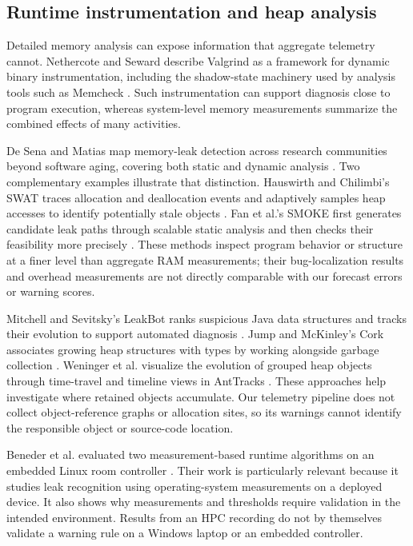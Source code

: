 \documentclass[10pt,a4paper,twocolumn]{article}
\begin{document}
\subsection{Runtime instrumentation and heap analysis}

Detailed memory analysis can expose information that aggregate telemetry cannot. Nethercote and Seward describe Valgrind as a framework for dynamic binary instrumentation, including the shadow-state machinery used by analysis tools such as Memcheck \cite{ref12}. Such instrumentation can support diagnosis close to program execution, whereas system-level memory measurements summarize the combined effects of many activities.

De Sena and Matias map memory-leak detection across research communities beyond software aging, covering both static and dynamic analysis \cite{ref13}. Two complementary examples illustrate that distinction. Hauswirth and Chilimbi's SWAT traces allocation and deallocation events and adaptively samples heap accesses to identify potentially stale objects \cite{ref14}. Fan et al.'s SMOKE first generates candidate leak paths through scalable static analysis and then checks their feasibility more precisely \cite{ref15}. These methods inspect program behavior or structure at a finer level than aggregate RAM measurements; their bug-localization results and overhead measurements are not directly comparable with our forecast errors or warning scores.

Mitchell and Sevitsky's LeakBot ranks suspicious Java data structures and tracks their evolution to support automated diagnosis \cite{ref16}. Jump and McKinley's Cork associates growing heap structures with types by working alongside garbage collection \cite{ref17}. Weninger et al. visualize the evolution of grouped heap objects through time-travel and timeline views in AntTracks \cite{ref18}. These approaches help investigate where retained objects accumulate. Our telemetry pipeline does not collect object-reference graphs or allocation sites, so its warnings cannot identify the responsible object or source-code location.

Beneder et al. evaluated two measurement-based runtime algorithms on an embedded Linux room controller \cite{ref19}. Their work is particularly relevant because it studies leak recognition using operating-system measurements on a deployed device. It also shows why measurements and thresholds require validation in the intended environment. Results from an HPC recording do not by themselves validate a warning rule on a Windows laptop or an embedded controller.
\end{document}
